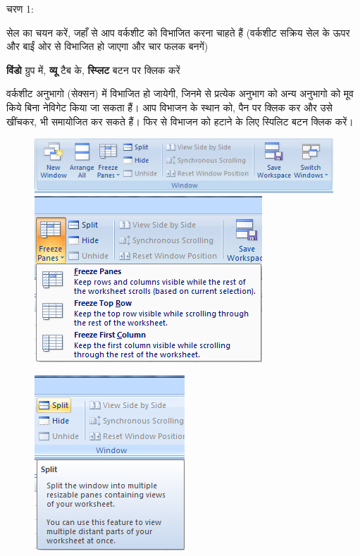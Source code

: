 \begin{descriptionSimple}{चरण 1:}
\item[चरण 1] सेल का चयन करें, जहाँ से आप वर्कशीट को विभाजित करना चाहते हैं (वर्कशीट सक्रिय सेल के ऊपर और बाईं ओर से विभाजित हो जाएगा और चार फलक बनगें)
\item[चरण 2] \textbf{विंडो} ग्रुप  में, \textbf{व्यू} टैब के, \textbf{स्प्लिट} बटन पर क्लिक करें
\end{descriptionSimple}

वर्कशीट अनुभागो (सेक्सन) में विभाजित हो जायेगी, जिनमे से प्रत्येक अनुभाग को अन्य अनुभागो को मूव किये बिना नेविगेट किया जा सकता हैं। आप विभाजन के स्थान को, पैन पर क्लिक कर और उसे खींचकर, भी समायोजित कर सकते हैं। फिर से विभाजन को हटाने के लिए स्पिलिट बटन क्लिक करें।

\begin{figure}[H]
\centering
\includegraphics[scale=0.6]{src/images/chapter1/chapter1_fig61.png}\\[4pt]
\includegraphics[scale=0.6]{src/images/chapter1/chapter1_fig62.png}
\end{figure}
\begin{figure}[H]
\centering
\includegraphics[scale=0.65]{src/images/chapter1/chapter1_fig63.png}
\end{figure}

